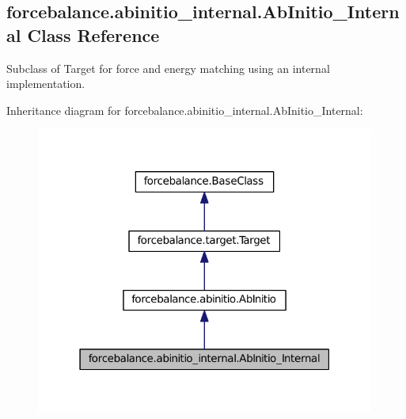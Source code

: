 \hypertarget{classforcebalance_1_1abinitio__internal_1_1AbInitio__Internal}{\subsection{forcebalance.\-abinitio\-\_\-internal.\-Ab\-Initio\-\_\-\-Internal \-Class \-Reference}
\label{classforcebalance_1_1abinitio__internal_1_1AbInitio__Internal}
}


\-Subclass of \-Target for force and energy matching using an internal implementation.  




\-Inheritance diagram for forcebalance.\-abinitio\-\_\-internal.\-Ab\-Initio\-\_\-\-Internal\-:
\nopagebreak
\begin{figure}[H]
\begin{center}
\leavevmode
\includegraphics[width=316pt]{classforcebalance_1_1abinitio__internal_1_1AbInitio__Internal__inherit__graph}
\end{center}
\end{figure}


